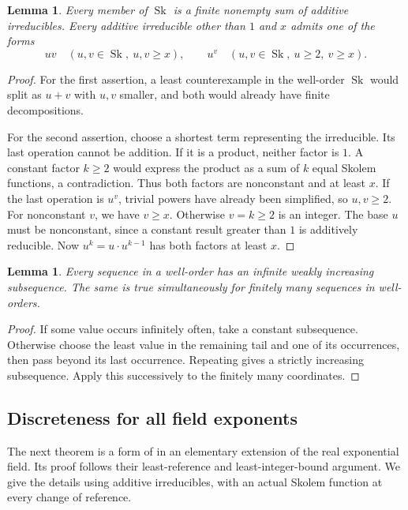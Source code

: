 \documentclass[11pt]{article}
\newtheorem{lemma}[theorem]{Lemma}
\theoremstyle{definition}
\theoremstyle{remark}
\newcommand{\Sk}{\operatorname{Sk}}
\numberwithin{equation}{section}
\begin{document}
\begin{lemma}\label{sf:lem:atoms}
Every member of $\Sk$ is a finite nonempty sum of additive irreducibles.
Every additive irreducible other than $1$ and $x$ admits one of the forms
\[
 uv\quad(u,v\in\Sk,\ u,v\ge x),\qquad
 u^v\quad(u,v\in\Sk,\ u\ge2,\ v\ge x).
\]
\end{lemma}
\begin{proof}
For the first assertion, a least counterexample in the well-order
$\Sk$ would split as $u+v$ with $u,v$ smaller, and both would
already have finite decompositions.

For the second assertion, choose a shortest term representing the
irreducible. Its last operation cannot be addition. If it is a product,
neither factor is $1$. A constant factor $k\ge2$ would express the
product as a sum of $k$ equal Skolem functions, a contradiction.
Thus both factors are nonconstant and at least $x$.
If the last operation is $u^v$, trivial powers have already been
simplified, so $u,v\ge2$. For nonconstant $v$, we have $v\ge x$.
Otherwise $v=k\ge2$ is an integer. The base $u$ must be nonconstant,
since a constant result greater than $1$ is additively reducible.
Now $u^k=u\cdot u^{k-1}$ has both factors at least $x$.
\end{proof}

\begin{lemma}\label{sf:lem:subsequence}
Every sequence in a well-order has an infinite weakly increasing
subsequence. The same is true simultaneously for finitely many
sequences in well-orders.
\end{lemma}
\begin{proof}
If some value occurs infinitely often, take a constant subsequence.
Otherwise choose the least value in the remaining tail and one of
its occurrences, then pass beyond its last occurrence. Repeating
gives a strictly increasing subsequence. Apply this successively to
the finitely many coordinates.
\end{proof}

\subsection{Discreteness for all field exponents}\label{sf:sec:discrete}

The next theorem is a form of \cite[Theorem~11.1]{BM} in an
elementary extension of the real exponential field. Its proof
follows their least-reference and least-integer-bound argument.
We give the details using additive irreducibles, with an actual
Skolem function at every change of reference.
\end{document}
